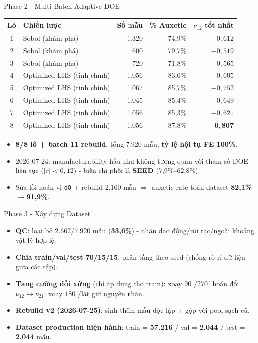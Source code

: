 \documentclass[aspectratio=169,11pt]{beamer}
\begin{document}
\begin{frame}{Phase 2 - Multi-Batch Adaptive DOE}
  \centering\scriptsize
  \begin{tabular}{@{}clrrr@{}}
    \toprule
    Lô & Chiến lược & Số mẫu & \% Auxetic & $\nu_{12}$ tốt nhất \\ \midrule
    1 & Sobol (khám phá) & 1.320 & 74,9\% & $-0{,}612$ \\
    2 & Sobol (khám phá) & 600 & 79,7\% & $-0{,}519$ \\
    3 & Sobol (khám phá) & 720 & 71,8\% & $-0{,}565$ \\
    4 & Optimized LHS (tinh chỉnh) & 1.056 & 83,6\% & $-0{,}605$ \\
    5 & Optimized LHS (tinh chỉnh) & 1.067 & 85,7\% & $-0{,}752$ \\
    6 & Optimized LHS (tinh chỉnh) & 1.045 & 85,4\% & $-0{,}649$ \\
    7 & Optimized LHS (tinh chỉnh) & 1.056 & 85,3\% & $-0{,}621$ \\
    8 & Optimized LHS (tinh chỉnh) & 1.056 & 87,8\% & $\mathbf{-0{,}807}$ \\
    \bottomrule
  \end{tabular}
  \vspace{2mm}
  \begin{itemize}\small
    \item \textbf{8/8 lô + batch 11 rebuild}, tổng 7.920 mẫu, \textbf{tỷ lệ hội tụ FE 100\%}.
    \item 2026-07-24: manufacturability hầu như không tương quan với tham số DOE liên tục ($|r|<0{,}12$) - biến chi phối là \textbf{SEED} (7,9\%--62,8\%).
    \item Sửa lỗi hoán vị \texttt{dQ} + rebuild 2.160 mẫu $\Rightarrow$ auxetic rate toàn dataset \textbf{82,1\%$\to$91,9\%}.
  \end{itemize}
\end{frame}

\begin{frame}{Phase 3 - Xây dựng Dataset}
  \begin{itemize}
    \item \textbf{QC}: loại bỏ 2.662/7.920 mẫu (\textbf{33,6\%}) - nhãn dao động/rời rạc/ngoài khoảng vật lý hợp lệ.
    \item \textbf{Chia train/val/test 70/15/15}, phân tầng theo seed (chống rò rỉ dữ liệu giữa các tập).
    \item \textbf{Tăng cường đối xứng} (chỉ áp dụng cho train): xoay $90^\circ/270^\circ$ hoán đổi $\nu_{12}\leftrightarrow\nu_{21}$; xoay $180^\circ$/lật giữ nguyên nhãn.
    \item \textbf{Rebuild v2 (2026-07-25)}: sinh thêm mẫu độc lập + gộp với pool sạch cũ.
    \item \textbf{Dataset production hiện hành}: train = \textbf{57.216} / val = \textbf{2.044} / test = \textbf{2.044} mẫu.
  \end{itemize}
\end{frame}
\end{document}
